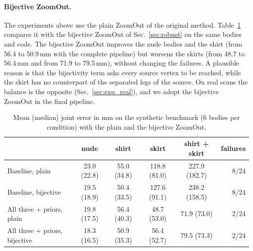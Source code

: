 \documentclass[11pt]{article}
\begin{document}
\paragraph{Bijective ZoomOut.}
The experiments above use the plain ZoomOut of the original method.
Table~\ref{tab:bijective_synth} compares it with the bijective ZoomOut of
Sec.~\ref{sec:robust} on the same bodies and code. The bijective ZoomOut
improves the nude bodies and the shirt (from 56.4 to 50.9\,mm with the
complete pipeline) but worsens the skirts (from 48.7 to 56.4\,mm and from 71.9
to 79.5\,mm), without changing the failures. A plausible reason is that the
bijectivity term asks every source vertex to be reached, while the skirt has no
counterpart of the separated legs of the source. On real scans the balance is
the opposite (Sec.~\ref{sec:exp_real}), and we adopt the bijective ZoomOut in
the final pipeline.

\begin{table}[t]
  \centering
  \caption{Mean (median) joint error in mm on the synthetic benchmark (6 bodies
  per condition) with the plain and the bijective ZoomOut.}
  \label{tab:bijective_synth}
  \small
  \begin{tabular}{lccccr}
    \toprule
    & nude & shirt & skirt & shirt + skirt & failures \\
    \midrule
    Baseline, plain             & 23.0 (22.8) & 55.0 (34.8) & 118.8 (81.0) & 227.9 (182.7) & 8/24 \\
    Baseline, bijective         & 19.5 (18.9) & 50.4 (33.5) & 127.6 (91.1) & 238.2 (158.5) & 8/24 \\
    All three + priors, plain     & 19.8 (17.5) & 56.4 (40.3) &  48.7 (53.0) &  71.9 (73.0)  & 2/24 \\
    All three + priors, bijective & 18.3 (16.5) & 50.9 (35.3) &  56.4 (52.7) &  79.5 (73.3)  & 2/24 \\
    \bottomrule
  \end{tabular}
\end{table}
\end{document}
